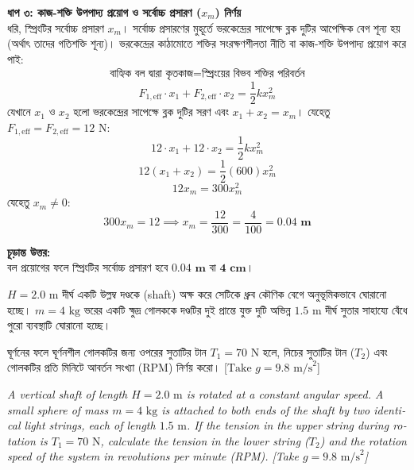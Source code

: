 \documentclass[12pt, a4paper]{article}
\begin{document}
\begin{tcolorbox}[solutionbox={সমাধান (Solution)}]
\vspace{0.5em}
\noindent
\textbf{ধাপ ৩: কাজ-শক্তি উপপাদ্য প্রয়োগ ও সর্বোচ্চ প্রসারণ ($x_m$) নির্ণয়} \\
ধরি, স্প্রিংটির সর্বোচ্চ প্রসারণ $x_m$। সর্বোচ্চ প্রসারণের মুহূর্তে ভরকেন্দ্রের সাপেক্ষে ব্লক দুটির আপেক্ষিক বেগ শূন্য হয় (অর্থাৎ তাদের গতিশক্তি শূন্য)। 
ভরকেন্দ্রের কাঠামোতে শক্তির সংরক্ষণশীলতা নীতি বা কাজ-শক্তি উপপাদ্য প্রয়োগ করে পাই:
$$\text{বাহ্যিক বল দ্বারা কৃতকাজ} = \text{স্প্রিংয়ের বিভব শক্তির পরিবর্তন}$$ 
$$F_{1,\text{eff}} \cdot x_1 + F_{2,\text{eff}} \cdot x_2 = \frac{1}{2} k x_m^2$$ 
যেখানে $x_1$ ও $x_2$ হলো ভরকেন্দ্রের সাপেক্ষে ব্লক দুটির সরণ এবং $x_1 + x_2 = x_m$। যেহেতু $F_{1,\text{eff}} = F_{2,\text{eff}} = 12\text{ N}$:
$$12 \cdot x_1 + 12 \cdot x_2 = \frac{1}{2} k x_m^2$$ 
$$12 (x_1 + x_2) = \frac{1}{2} (600) x_m^2$$ 
$$12 x_m = 300 x_m^2$$ 
যেহেতু $x_m \neq 0$:
$$300 x_m = 12 \implies x_m = \frac{12}{300} = \frac{4}{100} = \mathbf{0.04\text{ m}}$$

\vspace{1em}
\begin{tcolorbox}[answerbox]
\textbf{চূড়ান্ত উত্তর:} \\
বল প্রয়োগের ফলে স্প্রিংটির সর্বোচ্চ প্রসারণ হবে $\mathbf{0.04\text{ m}}$ বা $\mathbf{4\text{ cm}}$।
\end{tcolorbox}
\end{tcolorbox}

\begin{tcolorbox}[questionbox={প্রশ্ন (Question) 16}]
\noindent
$H = 2.0\text{ m}$ দীর্ঘ একটি উল্লম্ব দণ্ডকে (shaft) অক্ষ করে সেটিকে ধ্রুব কৌণিক বেগে অনুভূমিকভাবে ঘোরানো হচ্ছে। $m = 4\text{ kg}$ ভরের একটি ক্ষুদ্র গোলককে দণ্ডটির দুই প্রান্তে যুক্ত দুটি অভিন্ন $1.5\text{ m}$ দীর্ঘ সুতার সাহায্যে বেঁধে পুরো ব্যবস্থাটি ঘোরানো হচ্ছে। 

\vspace{0.3em}
\noindent
ঘূর্ণনের ফলে ঘূর্ণনশীল গোলকটির জন্য ওপরের সুতাটির টান $T_1 = 70\text{ N}$ হলে, নিচের সুতাটির টান ($T_2$) এবং গোলকটির প্রতি মিনিটে আবর্তন সংখ্যা (RPM) নির্ণয় করো। [$\text{Take } g = 9.8\text{ m/s}^2$]

\vspace{0.8em}
\begin{english}
\noindent\textit{\color{darkgray}
A vertical shaft of length $H = 2.0\text{ m}$ is rotated at a constant angular speed. A small sphere of mass $m = 4\text{ kg}$ is attached to both ends of the shaft by two identical light strings, each of length $1.5\text{ m}$. If the tension in the upper string during rotation is $T_1 = 70\text{ N}$, calculate the tension in the lower string ($T_2$) and the rotation speed of the system in revolutions per minute (RPM). [Take $g = 9.8\text{ m/s}^2$]
}
\end{english}
\end{tcolorbox}
\end{document}
